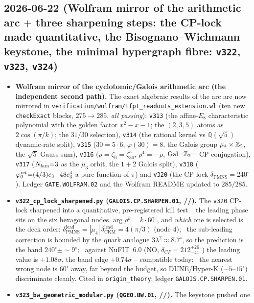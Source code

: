 \subsection*{2026-06-22 (Wolfram mirror of the arithmetic arc $+$ three sharpening steps: the CP-lock made quantitative, the Bisognano--Wichmann keystone, the minimal hypergraph fibre: \texttt{v322}, \texttt{v323}, \texttt{v324})}
\begin{itemize}
\item \textbf{Wolfram mirror of the cyclotomic/Galois arithmetic arc (the independent second path).} The exact
  algebraic results of the arc are now mirrored in \texttt{verification/wolfram/tfpt\_readouts\_extension.wl} (ten new
  \texttt{checkExact} blocks, $275\to285$, \emph{all passing}): \texttt{v313} (the affine-$E_8$ characteristic
  polynomial with the golden factor $x^2{-}x{-}1$; the $(2,3,5)$ atoms as
  $2\cos(\pi/k)$; the $31/30$ selection), \texttt{v314} (the rational kernel vs $\mathbb Q(\sqrt5)$
  dynamic-rate split), \texttt{v315} ($30{=}5{\cdot}6$, $\varphi(30){=}8$, the Galois group $\mu_4\times\mathbb{Z}_2$, the
  $\sqrt5$ Gauss sum), \texttt{v316} ($\rho{=}\zeta_6{=}\zeta_{30}^5$, $\rho^4{=}-\rho$, $\mathrm{Gal}{=}\mathbb{Z}_2{=}$ CP
  conjugation), \texttt{v317} ($N_{\mathrm{fam}}{=}3$ as the $\mu_3$ orbit, the $1{+}2$ Galois split), \texttt{v318}
  ($\varphi_0^{\mathrm{ret}}{=}(4/3)c_3{+}48c_3^4$ a pure function of $\pi$) and \texttt{v320} (the CP lock
  $\delta_{\mathrm{PMNS}}{=}240^\circ$). Ledger \texttt{GATE.WOLFRAM.02} and the Wolfram README updated to $285/285$.
\item \textbf{\texttt{v322\_cp\_lock\_sharpened.py} (\texttt{GALOIS.CP.SHARPEN.01}, \mE/\mC/\mX).} The \texttt{v320}
  CP-lock sharpened into a quantitative, pre-registered kill test. \mE\ the leading phase sits on the six hexagonal
  nodes $\arg\rho^k{=}k\cdot60^\circ$, and \emph{which} one is selected is the deck order:
  $\delta_{\mathrm{PMNS}}^{\mathrm{lead}}{=}|\mu_4|\,\delta_{\mathrm{CKM}}^{\mathrm{lead}}{=}4(\pi/3)$ (node $4$);
  \mC\ the sub-leading correction is bounded by the quark analogue $3\lambda^2\approx8.7^\circ$, so the prediction is
  the band $240^\circ\pm\sim9^\circ$; \mC\ against NuFIT~6.0 (NO, $\delta_{CP}{=}212^{+26}_{-41}{}^\circ$) the leading
  value is $+1.08\sigma$, the band edge $+0.74\sigma$ -- compatible today; \mX\ the nearest wrong node is $60^\circ$
  away, far beyond the budget, so DUNE/Hyper-K ($\sim5$--$15^\circ$) discriminate cleanly. Cited in
  \texttt{origin\_theory}; ledger \texttt{GALOIS.CP.SHARPEN.01}.
\item \textbf{\texttt{v323\_bw\_geometric\_modular.py} (\texttt{QGEO.BW.01}, \mE/\mC/\mO).} The keystone pushed one

\end{itemize}
